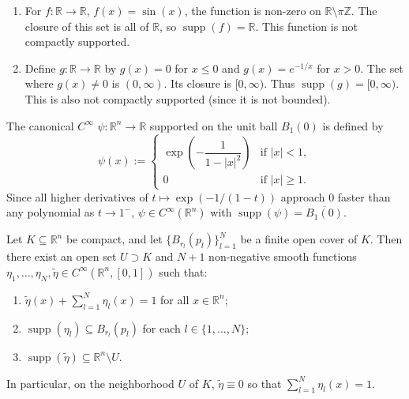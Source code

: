 \begin{example}
\label{ex:supports_functions}
\begin{enumerate}[label=\textbf{(\alph*)}]
  \item For $f: \mathbb{R} \to \mathbb{R}$, $f(x) = \sin(x)$, the function is non-zero on $\mathbb{R} \setminus \pi\mathbb{Z}$. The closure of this set is all of $\mathbb{R}$, so $\operatorname{supp}(f) = \mathbb{R}$. This function is not compactly supported.
  \item Define $g: \mathbb{R} \to \mathbb{R}$ by $g(x) = 0$ for $x \le 0$ and $g(x) = e^{-1/x}$ for $x > 0$. The set where $g(x) \neq 0$ is $(0, \infty)$. Its closure is $[0, \infty)$. Thus $\operatorname{supp}(g) = [0, \infty)$. This is also not compactly supported (since it is not bounded).
\end{enumerate}
\end{example}

\begin{definition}
\label{def:smooth_bump_function}
The canonical $C^\infty$   $\psi : \mathbb{R}^n \to \mathbb{R}$ supported on the unit ball $B_1(0)$ is defined by
\[
\psi(x) := \begin{cases} \exp\!\left(-\dfrac{1}{1 - |x|^2}\right) & \text{if } |x| < 1, \\[1.5ex] 0 & \text{if } |x| \geq 1. \end{cases}
\]
Since all higher derivatives of $t \mapsto \exp(-1/(1-t))$ approach $0$ faster than any polynomial as $t \to 1^-$, $\psi \in C^\infty(\mathbb{R}^n)$ with $\operatorname{supp}(\psi) = \overline{B_1(0)}$.
\end{definition}

\begin{proposition}
\label{prop:partition_of_unity_finite}
Let $K \subseteq \mathbb{R}^n$ be compact, and let $\{B_{r_l}(p_l)\}_{l=1}^N$ be a finite open cover of $K$. Then there exist an open set $U \supset K$ and $N+1$ non-negative smooth functions $\eta_1, \dots, \eta_N, \tilde{\eta} \in C^\infty(\mathbb{R}^n, [0,1])$ such that:
\begin{enumerate}[label=\textbf{(\alph*)}]
  \item $\tilde{\eta}(x) + \sum_{l=1}^N \eta_l(x) = 1$ for all $x \in \mathbb{R}^n$;
  \item $\operatorname{supp}(\eta_l) \subseteq B_{r_l}(p_l)$ for each $l \in \{1, \dots, N\}$;
  \item $\operatorname{supp}(\tilde{\eta}) \subseteq \mathbb{R}^n \setminus U$.
\end{enumerate}
In particular, on the neighborhood $U$ of $K$, $\tilde{\eta} \equiv 0$ so that $\sum_{l=1}^N \eta_l(x) = 1$.
\end{proposition}


